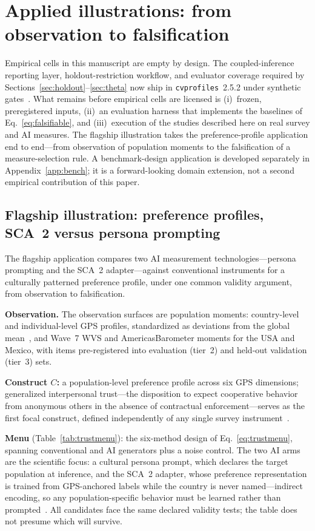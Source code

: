 \documentclass[10pt,letterpaper]{article}
\newcommand{\cvp}{\texttt{cvprofiles}}
\begin{document}
\section{Applied illustrations: from observation to falsification}
\label{sec:plan}
Empirical cells in this manuscript are empty by design.
The coupled-inference reporting layer, holdout-restriction workflow, and evaluator coverage required by Sections~\ref{sec:holdout}--\ref{sec:theta} now ship in \cvp{}~2.5.2 under synthetic gates~\cite{cvprofiles}.
What remains before empirical cells are licensed is (i)~frozen, preregistered inputs, (ii)~an evaluation harness that implements the baselines of Eq.~\eqref{eq:falsifiable}, and (iii)~execution of the studies described here on real survey and AI measures.
The flagship illustration takes the preference-profile application end to end---from observation of population moments to the falsification of a measure-selection rule. A benchmark-design application is developed separately in Appendix~\ref{app:bench}; it is a forward-looking domain extension, not a second empirical contribution of this paper.

\subsection{Flagship illustration: preference profiles, SCA~2 versus persona prompting}
The flagship application compares two AI measurement technologies---persona prompting and the SCA~2 adapter---against conventional instruments for a culturally patterned preference profile, under one common validity argument, from observation to falsification.

\textbf{Observation.} The observation surfaces are population moments: country-level and individual-level GPS profiles, standardized as deviations from the global mean~\cite{falk2018}, and Wave~7 WVS and AmericasBarometer moments for the USA and Mexico, with items pre-registered into evaluation (tier~2) and held-out validation (tier~3) sets.

\textbf{Construct $C$:} a population-level preference profile across six GPS dimensions; generalized interpersonal trust---the disposition to expect cooperative behavior from anonymous others in the absence of contractual enforcement---serves as the first focal construct, defined independently of any single survey instrument~\cite{glaeser2000,sapienza2013,butler2016}.

\textbf{Menu} (Table~\ref{tab:trustmenu}): the six-method design of Eq.~\eqref{eq:trustmenu}, spanning conventional and AI generators plus a noise control.
The two AI arms are the scientific focus: a cultural persona prompt, which declares the target population at inference, and the SCA~2 adapter, whose preference representation is trained from GPS-anchored labels while the country is never named---indirect encoding, so any population-specific behavior must be learned rather than prompted~\cite{capra2025}.
All candidates face the same declared validity tests; the table does not presume which will survive.
\end{document}
